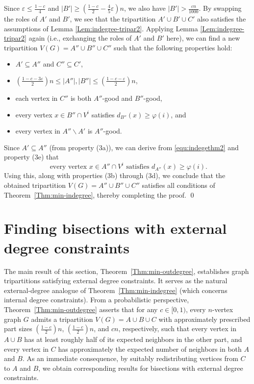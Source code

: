 \documentclass{aic}
\begin{document}
	Since $\varepsilon\leq \frac{1-c}{4}$ and $|B'|\ge \left(\frac{1-c}{2}-\frac{4}{5}\varepsilon\right)n$, we also have $|B'|>\frac{\varepsilon n}{1000}$.
	By swapping the roles of $A'$ and $B'$, we see that the tripartition $A'\cup B'\cup C'$ also
	satisfies the assumptions of Lemma \ref{Lem:indegree-tripar2}.
	Applying Lemma \ref{Lem:indegree-tripar2} again (i.e., exchanging the roles of $A'$ and $B'$ here),
	we can find a new tripartition $V(G)=A''\cup B''\cup C''$ such that the following properties hold:
	\begin{itemize}
		\item[(3a).] $A'\subseteq A''$ and $C''\subseteq C'$,
		\item[(3b).] $\left(\frac{1-c-3\varepsilon}{2}\right)n\leq |A''|,|B''|\leq \left(\frac{1-c-\varepsilon}{2}\right)n$,
		\item[(3c).] each vertex in $C''$ is both $A''$-good and $B''$-good,
		\item[(3d).] every vertex $x\in B''\cap V^i$ satisfies $d_{B''}(x)\ge \varphi(i)$, and
		\item[(3e).] every vertex in $A''\backslash A'$ is $A''$-good.
	\end{itemize}
	
	Since $A' \subseteq A''$ (from property (3a)), we can derive from \eqref{equ:indegethm2} and property (3e) that
	\begin{equation*}\label{equ:indegethm6}
		\text{ every vertex } x\in A''\cap V^i \text{ satisfies } d_{A''}(x)\ge \varphi(i).
	\end{equation*}
	Using this, along with properties (3b) through (3d), we conclude that the obtained tripartition $V(G) = A'' \cup B'' \cup C''$ satisfies all conditions of Theorem~\ref{Thm:min-indegree}, thereby completing the proof.
	\qed
	
	\section{Finding bisections with external degree constraints}\label{sec:ext}
	\noindent
	The main result of this section, Theorem~\ref{Thm:min-outdegree}, establishes graph tripartitions satisfying external degree constraints.
	It serves as the natural external-degree analogue of Theorem~\ref{Thm:min-indegree} (which concerns internal degree constraints).
	From a probabilistic perspective, Theorem~\ref{Thm:min-outdegree} asserts that for any $c \in [0,1)$, every $n$-vertex graph $G$ admits a tripartition $V(G) = A \cup B \cup C$ with approximately prescribed part sizes $\left(\frac{1-c}{2}\right)n$, $\left(\frac{1-c}{2}\right)n$, and $cn$, respectively, such that every vertex in $A\cup B$ has at least roughly half of its expected neighbors in the other part, and every vertex in $C$ has approximately the expected number of neighbors in both $A$ and $B$.
	As an immediate consequence, by suitably redistributing vertices from $C$ to $A$ and $B$,
	we obtain corresponding results for bisections with external degree constraints.
	
\end{document}
